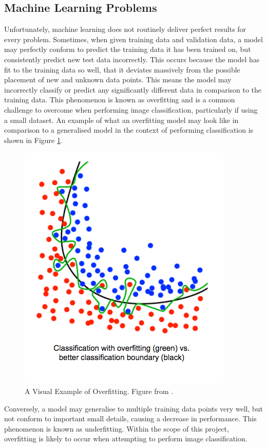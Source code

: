 \documentclass{l4proj}
\begin{document}
\subsection{Machine Learning Problems}
Unfortunately, machine learning does not routinely deliver perfect results for every problem.
Sometimes, when given training data and validation data, a model may perfectly conform to predict the training data it has been trained on, but consistently predict new test data incorrectly. 
This occurs because the model has fit to the training data so well, that it deviates massively from the possible placement of new and unknown data points. 
This means the model may incorrectly classify or predict any significantly different data in comparison to the training data. 
This phenomenon is known as overfitting and is a common challenge to overcome when performing image classification, particularly if using a small dataset.
An example of what an overfitting model may look like in comparison to a generalised model in the context of performing classification is shown in Figure \ref{fig:BackgroundOverfitting}.

\begin{figure}[h]
	\centering
	\includegraphics[scale=0.5]{classification-with-overfitting}
	\caption{A Visual Example of Overfitting. Figure from \cite{overfittingGraph}.}
	\label{fig:BackgroundOverfitting}
\end{figure}

Conversely, a model may generalise to multiple training data points very well, but not conform to important small details, causing a decrease in performance.
This phenomenon is known as underfitting.
Within the scope of this project, overfitting is likely to occur when attempting to perform image classification.
\end{document}
